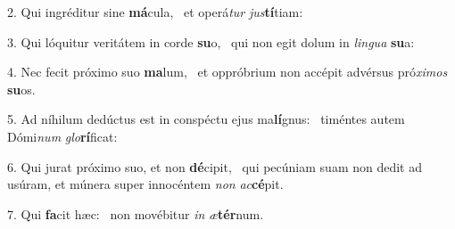 2. Qui ingréditur sine \textbf{má}cula, \ast\  et operá\textit{tur} \textit{jus}\textbf{tí}tiam:\

3. Qui lóquitur veritátem in corde \textbf{su}o, \ast\  qui non egit dolum in \textit{lin}\textit{gua} \textbf{su}a:\

4. Nec fecit próximo suo \textbf{ma}lum, \ast\  et oppróbrium non accépit advérsus pró\textit{xi}\textit{mos} \textbf{su}os.\

5. Ad níhilum dedúctus est in conspéctu ejus ma\textbf{lí}gnus: \ast\  timéntes autem Dómi\textit{num} \textit{glo}\textbf{rí}ficat:\

6. Qui jurat próximo suo, et non \textbf{dé}cipit, \ast\  qui pecúniam suam non dedit ad usúram, et múnera super innocéntem \textit{non} \textit{ac}\textbf{cé}pit.\

7. Qui \textbf{fa}cit hæc: \ast\  non movébitur \textit{in} \textit{æ}\textbf{tér}num.\

